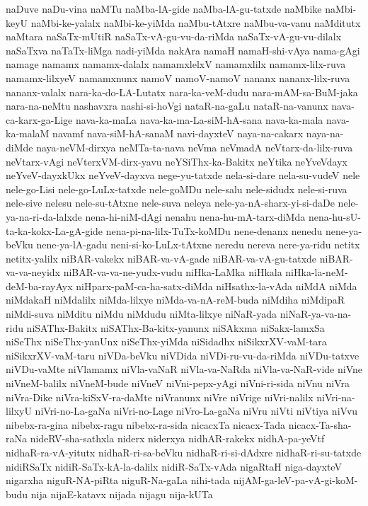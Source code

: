 {naDuve
naDu-vina
naMTu
naMba-lA-gide
naMba-lA-gu-tatxde
naMbike
naMbi-keyU
naMbi-ke-yalalx
naMbi-ke-yiMda
naMbu-tAtxre
naMbu-va-vanu
naMditutx
naMtara
naSaTx-mUtiR
naSaTx-vA-gu-vu-da-riMda
naSaTx-vA-gu-vu-dilalx
naSaTxva
naTaTx-liMga
nadi-yiMda
nakAra
namaH
namaH-shi-vAya
nama-gAgi
namage
namamx
namamx-dalalx
namamxlelxV
namamxlilx
namamx-lilx-ruva
namamx-lilxyeV
namamxnunx
namoV
namoV-namoV
nananx
nananx-lilx-ruva
nananx-valalx
nara-ka-do-LA-Lutatx
nara-ka-veM-dudu
nara-mAM-sa-BuM-jaka
nara-na-neMtu
nashavxra
nashi-si-hoVgi
nataR-na-gaLu
nataR-na-vanunx
nava-ca-karx-ga-Lige
nava-ka-maLa
nava-ka-ma-La-siM-hA-sana
nava-ka-mala
nava-ka-malaM
navamf
nava-siM-hA-sanaM
navi-dayxteV
naya-na-cakarx
naya-na-diMde
naya-neVM-dirxya
neMTa-ta-nava
neVma
neVmadA
neVtarx-da-lilx-ruva
neVtarx-vAgi
neVterxVM-dirx-yavu
neYSiThx-ka-Bakitx
neYtika
neYveVdayx
neYveV-dayxkUkx
neYveV-dayxva
nege-yu-tatxde
nela-si-dare
nela-su-vudeV
nele
nele-go-Lisi
nele-go-LuLx-tatxde
nele-goMDu
nele-salu
nele-sidudx
nele-si-ruva
nele-sive
nelesu
nele-su-tAtxne
nele-suva
neleya
nele-ya-nA-sharx-yi-si-daDe
nele-ya-na-ri-da-lalxde
nena-hi-niM-dAgi
nenahu
nena-hu-mA-tarx-diMda
nena-hu-sU-ta-ka-kokx-La-gA-gide
nena-pi-na-lilx-TuTx-koMDu
nene-denanx
nenedu
nene-ya-beVku
nene-ya-lA-gadu
neni-si-ko-LuLx-tAtxne
neredu
nereva
nere-ya-ridu
netitx
netitx-yalilx
niBAR-vakekx
niBAR-va-vA-gade
niBAR-va-vA-gu-tatxde
niBAR-va-va-neyidx
niBAR-va-va-ne-yudx-vudu
niHka-LaMka
niHkala
niHka-la-neM-deM-ba-rayAyx
niHparx-paM-ca-ha-satx-diMda
niHsathx-la-vAda
niMdA
niMda
niMdakaH
niMdalilx
niMda-lilxye
niMda-va-nA-reM-buda
niMdiha
niMdipaR
niMdi-suva
niMditu
niMdu
niMdudu
niMta-lilxye
niNaR-yada
niNaR-ya-va-na-ridu
niSAThx-Bakitx
niSAThx-Ba-kitx-yanunx
niSAkxma
niSakx-lamxSa
niSeThx
niSeThx-yanUnx
niSeThx-yiMda
niSidadhx
niSikxrXV-vaM-tara
niSikxrXV-vaM-taru
niVDa-beVku
niVDida
niVDi-ru-vu-da-riMda
niVDu-tatxve
niVDu-vaMte
niVlamamx
niVla-vaNaR
niVla-va-NaRda
niVla-va-NaR-vide
niVne
niVneM-balilx
niVneM-bude
niVneV
niVni-pepx-yAgi
niVni-ri-sida
niVnu
niVra
niVra-Dike
niVra-kiSxV-ra-daMte
niVranunx
niVre
niVrige
niVri-nalilx
niVri-na-lilxyU
niVri-no-La-gaNa
niVri-no-Lage
niVro-La-gaNa
niVru
niVti
niVtiya
niVvu
nibebx-ra-gina
nibebx-ragu
nibebx-ra-sida
nicacxTa
nicacx-Tada
nicacx-Ta-sha-raNa
nideRV-sha-sathxla
niderx
niderxya
nidhAR-rakekx
nidhA-pa-yeVtf
nidhaR-ra-vA-yitutx
nidhaR-ri-sa-beVku
nidhaR-ri-si-dAdxre
nidhaR-ri-su-tatxde
nidiRSaTx
nidiR-SaTx-kA-la-dalilx
nidiR-SaTx-vAda
nigaRtaH
niga-dayxteV
nigarxha
niguR-NA-piRta
niguR-Na-gaLa
nihi-tada
nijAM-ga-leV-pa-vA-gi-koM-budu
nija
nijaE-katavx
nijada
nijagu
nija-kUTa
}
